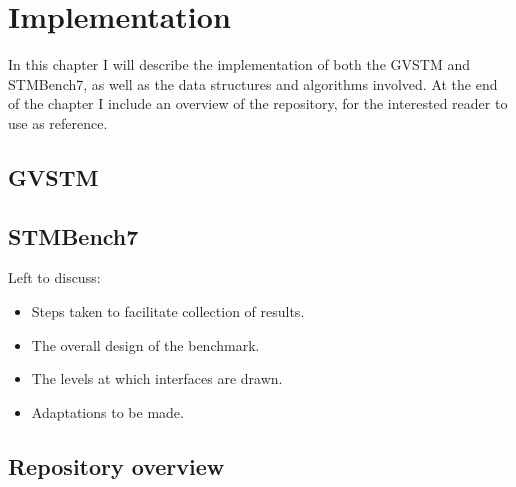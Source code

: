 \documentclass[12pt,a4paper,oneside,openright]{report}
\newcommand{\mycaption}[2]{\caption[#1]{#1 #2}}
\begin{document}
\chapter{Implementation}

In this chapter I will describe the implementation of both the GVSTM
and STMBench7, as well as the data structures and algorithms
involved. At the end of the chapter I include an overview of the
repository, for the interested reader to use as reference.

\section{GVSTM}
\label{sec:impl:gvstm}

\section{STMBench7}
\label{sec:impl:stmbench7}

Left to discuss:

\begin{itemize}
\item Steps taken to facilitate collection of results.
\item The overall design of the benchmark.
\item The levels at which interfaces are drawn.
\item Adaptations to be made.
\end{itemize}

\section{Repository overview}
\label{sec:impl:repository-overview}


\end{document}

